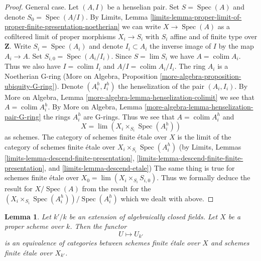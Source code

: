 \documentclass{stacks-project}
\theoremstyle{plain}
\newtheorem{lemma}[subsection]{Lemma}
\theoremstyle{definition}
\theoremstyle{remark}
\numberwithin{equation}{subsection}
\def\lim{\mathop{\mathrm{lim}}\nolimits}
\def\colim{\mathop{\mathrm{colim}}\nolimits}
\def\Spec{\mathop{\mathrm{Spec}}}
\begin{document}
\begin{proof}
\medskip\noindent
General case. Let $(A, I)$ be a henselian pair.
Set $S = \Spec(A)$ and denote $S_0 = \Spec(A/I)$. By Limits, Lemma
\ref{limits-lemma-proper-limit-of-proper-finite-presentation-noetherian}
we can write $X \to \Spec(A)$ as a cofiltered limit of
proper morphisms $X_i \to S_i$ with $S_i$ affine and of finite type
over $\mathbf{Z}$. Write $S_i = \Spec(A_i)$ and denote
$I_i \subset A_i$ the inverse image of $I$ by the map $A_i \to A$.
Set $S_{i, 0} = \Spec(A_i/I_i)$. Since $S = \lim S_i$ we have
$A = \colim A_i$. Thus we also have $I = \colim I_i$ and $A/I = \colim A_i/I_i$.
The ring $A_i$ is a Noetherian G-ring (More on Algebra, Proposition
\ref{more-algebra-proposition-ubiquity-G-ring}).
Denote $(A_i^h, I_i^h)$ the henselization of the pair $(A_i, I_i)$.
By More on Algebra, Lemma \ref{more-algebra-lemma-henselization-colimit}
we see that $A = \colim A_i^h$. By
More on Algebra, Lemma \ref{more-algebra-lemma-henselization-pair-G-ring}
the rings $A_i^h$ are G-rings. Thus we see that $A = \colim A_i^h$ and
$$
X = \lim (X_i \times_{S_i} \Spec(A_i^h))
$$
as schemes. The category of schemes finite \'etale over $X$ is the limit
of the category of schemes finite \'etale over
$X_i \times_{S_i} \Spec(A_i^h)$ (by
Limits, Lemmas
\ref{limits-lemma-descend-finite-presentation},
\ref{limits-lemma-descend-finite-finite-presentation}, and
\ref{limits-lemma-descend-etale})
The same thing is true for schemes finite \'etale over
$X_0 = \lim (X_i \times_{S_i} S_{i, 0})$.
Thus we formally deduce the result for $X / \Spec(A)$
from the result for the $(X_i \times_{S_i} \Spec(A_i^h)) / \Spec(A_i^h)$
which we dealt with above.
\end{proof}

\begin{lemma}
\label{lemma-finite-etale-invariant-over-proper}
Let $k'/k$ be an extension of algebraically closed fields.
Let $X$ be a proper scheme over $k$. Then the functor
$$
U \longmapsto U_{k'}
$$
is an equivalence of categories between schemes finite \'etale over
$X$ and schemes finite \'etale over $X_{k'}$.
\end{lemma}
\end{document}
